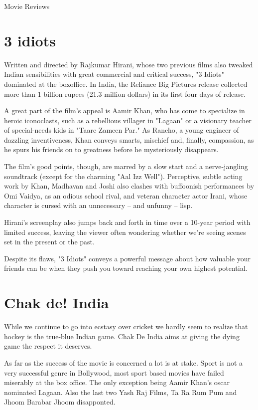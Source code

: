 \documentclass[11pt]{article}
\begin{document}
\begin{center}
\begin{Huge}
Movie Reviews
\end{Huge}
\end{center}
\section*{ 3 idiots }

Written and directed by Rajkumar Hirani, whose two previous films also tweaked Indian sensibilities with great commercial and critical success, "3 Idiots" dominated at the boxoffice. In India, the Reliance Big Pictures release collected more than 1 billion rupees (21.3 million dollars) in its first four days of release.

A great part of the film's appeal is Aamir Khan, who has come to specialize in heroic iconoclasts, such as a rebellious villager in "Lagaan" or a visionary teacher of special-needs kids in "Taare Zameen Par." As Rancho, a young engineer of dazzling inventiveness, Khan conveys smarts, mischief and, finally, compassion, as he spurs his friends on to greatness before he mysteriously disappears.

The film's good points, though, are marred by a slow start and a nerve-jangling soundtrack (except for the charming "Aal Izz Well"). Perceptive, subtle acting work by Khan, Madhavan and Joshi also clashes with buffoonish performances by Omi Vaidya, as an odious school rival, and veteran character actor Irani, whose character is cursed with an unnecessary -- and unfunny -- lisp.


Hirani's screenplay also jumps back and forth in time over a 10-year period with limited success, leaving the viewer often wondering whether we're seeing scenes set in the present or the past.


Despite its flaws, "3 Idiots" conveys a powerful message about how valuable your friends can be when they push you toward reaching your own highest potential.

\section*{ Chak de! India}
While we continue to go into ecstasy over cricket we hardly seem to realize that hockey is the true-blue Indian game. Chak De India aims at giving the dying game the respect it deserves.

As far as the success of the movie is concerned a lot is at stake. Sport is not a very successful genre in Bollywood, most sport based movies have failed miserably at the box office. The only exception being Aamir Khan’s oscar nominated Lagaan. Also the last two Yash Raj Films, Ta Ra Rum Pum and Jhoom Barabar Jhoom disapponted.
\end{document}
